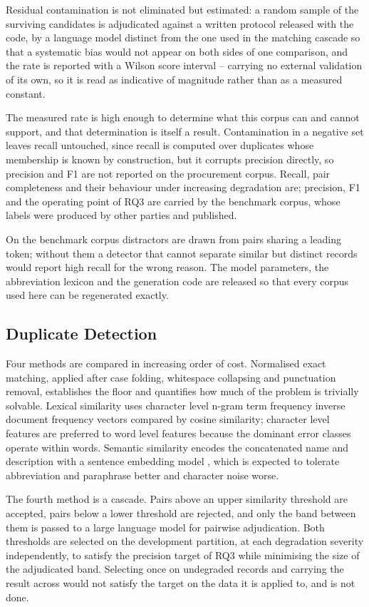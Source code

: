 \documentclass[conference]{IEEEtran}
\begin{document}
Residual contamination is not eliminated but estimated: a random
sample of the surviving candidates is adjudicated against a written
protocol released with the code, by a language model distinct from
the one used in the matching cascade so that a systematic bias would
not appear on both sides of one comparison, and the rate is reported
with a Wilson score interval -- carrying no external validation of its
own, so it is read as indicative of magnitude rather than as a
measured constant.

The measured rate is high enough to determine what this corpus can and
cannot support, and that determination is itself a result.
Contamination in a negative set leaves recall untouched, since recall
is computed over duplicates whose membership is known by construction,
but it corrupts precision directly, so precision and F1 are not
reported on the procurement corpus. Recall, pair completeness and
their behaviour under increasing degradation are; precision, F1 and
the operating point of RQ3 are carried by the benchmark corpus, whose
labels were produced by other parties and published.

On the benchmark corpus distractors are drawn from pairs sharing a
leading token; without them a detector that cannot separate similar
but distinct records would report high recall for the wrong reason.
The model parameters, the abbreviation lexicon and the generation code
are released so that every corpus used here can be regenerated
exactly.

\subsection{Duplicate Detection}

Four methods are compared in increasing order of cost. Normalised exact
matching, applied after case folding, whitespace collapsing and
punctuation removal, establishes the floor and quantifies how much of
the problem is trivially solvable. Lexical similarity uses character
level n-gram term frequency inverse document frequency vectors compared
by cosine similarity; character level features are preferred to
word level features because the dominant error classes operate within
words. Semantic similarity encodes the concatenated name and description
with a sentence embedding model \cite{reimers2019}, which is expected to
tolerate abbreviation and paraphrase better and character noise worse.

The fourth method is a cascade. Pairs above an upper similarity
threshold are accepted, pairs below a lower threshold are rejected, and
only the band between them is passed to a large language model for
pairwise adjudication. Both thresholds are selected on the development partition, at each
degradation severity independently, to satisfy the precision target of
RQ3 while minimising the size of the adjudicated band. Selecting once on
undegraded records and carrying the result across would not satisfy the
target on the data it is applied to, and is not done.
\end{document}

